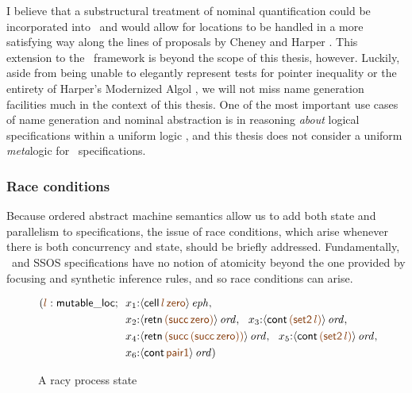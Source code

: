 
I believe that a substructural treatment of nominal quantification
could be incorporated into \sls~and would allow for locations to be
handled in a more satisfying way along the lines of proposals by
Cheney and Harper \cite{cheney12dependent,harper12practical}. This
extension to the \sls~framework is beyond the scope of this thesis,
however. Luckily, aside from being unable to elegantly represent tests
for pointer inequality or the entirety of Harper's Modernized Algol
\cite[Chapter 35]{harper12practical}, we will not miss name generation
facilities much in the context of this thesis. One of the most important
use cases of name generation and nominal abstraction is in reasoning
{\it about} logical specifications within a uniform logic
\cite{gacek11nominal}, and this thesis does not consider a uniform {\it
  meta}logic for \sls~specifications.

\subsubsection{Race conditions}

Because ordered abstract machine semantics allow us to add both state
and parallelism to specifications, the issue of race conditions, which
arise whenever there is both concurrency and state, should be briefly
addressed. Fundamentally, \sls~and SSOS specifications have no notion
of atomicity beyond the one provided by focusing and synthetic
inference rules, and so race conditions can arise. 


\begin{figure}[ht]
\begin{align*}
(\lf{l}:{\sf mutable\_loc}; &
~~ x_1{:}\iseph{\susp{{\sf cell}\,\lf{l}\,\lf{\sf zero}}}, \\
& ~~ x_2{:}\istrue{\susp{{\sf retn}\,\lf{\sf (succ\,zero)}}},
~~ x_3{:}\istrue{\susp{{\sf cont}\,\lf{({\sf set2}\,l)}}},
\\
& ~~ x_4{:}\istrue{\susp{{\sf retn}\,\lf{\sf (succ\,(succ\,zero))}}},
~~ x_5{:}\istrue{\susp{{\sf cont}\,\lf{({\sf set2}\,l)}}},
\\
&~~ x_6{:}\istrue{\susp{{\sf cont}\,\lf{\sf pair1}}})
\end{align*}
\caption{A racy process state}
\label{fig:racystate}
\end{figure}

